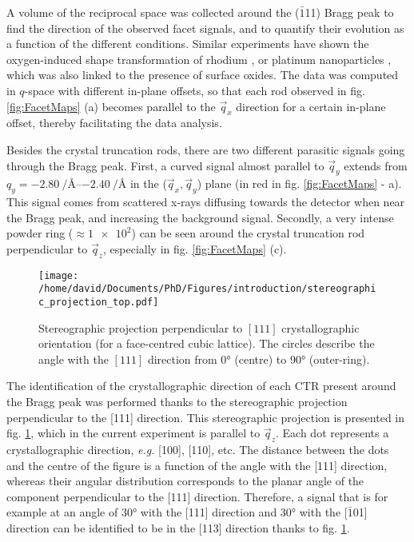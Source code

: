 A volume of the reciprocal space was collected around the ($\bar{1}$11) Bragg peak to find the direction of the observed facet signals, and to quantify their evolution as a function of the different conditions.
Similar experiments have shown the oxygen-induced shape transformation of rhodium \parencite{Nolte2008}, or platinum nanoparticles \parencite{Hejral2013}, which was also linked to the presence of surface oxides.
The data was computed in $q$-space with different in-plane offsets, so that each rod observed in fig. \ref{fig:FacetMaps} (a) becomes parallel to the $\vec{q}_x$ direction for a certain in-plane offset, thereby facilitating the data analysis.

Besides the crystal truncation rods, there are two different parasitic signals going through the Bragg peak.
First, a curved signal almost parallel to $\vec{q}_y$ extends from $q_y = \qtyrange{-2.80}{-2.40}{\per\angstrom}$ in the ($\vec{q}_x, \vec{q}_y$) plane (in red in fig. \ref{fig:FacetMaps} - a).
This signal comes from scattered x-rays diffusing towards the detector when near the Bragg peak, and increasing the background signal.
Secondly, a very intense powder ring ($\approx \num{1e2}$) can be seen around the crystal truncation rod perpendicular to $\vec{q}_z$, especially in fig. \ref{fig:FacetMaps} (c).

\begin{figure}[!htb]
    \centering
    \texttt{[image: /home/david/Documents/PhD/Figures/introduction/stereographic\_projection\_top.pdf]}
    \caption{
        Stereographic projection perpendicular to $[111]$ crystallographic orientation (for a face-centred cubic lattice).
        The circles describe the angle with the $[111]$ direction from \ang{0} (centre) to \ang{90} (outer-ring).
    }
    \label{fig:StereoTop}
\end{figure}

The identification of the crystallographic direction of each CTR present around the Bragg peak was performed thanks to the stereographic projection perpendicular to the [111] direction.
This stereographic projection is presented in fig. \ref{fig:StereoTop}, which in the current experiment is parallel to $\vec{q}_z$.
Each dot represents a crystallographic direction, \textit{e.g.} [100], [110], etc.
The distance between the dots and the centre of the figure is a function of the angle with the [111] direction, whereas their angular distribution corresponds to the planar angle of the component perpendicular to the [111] direction.
Therefore, a signal that is for example at an angle of \ang{30} with the [111] direction and \ang{30} with the [$\bar{1}$01] direction can be identified to be in the [113] direction thanks to fig. \ref{fig:StereoTop}.

